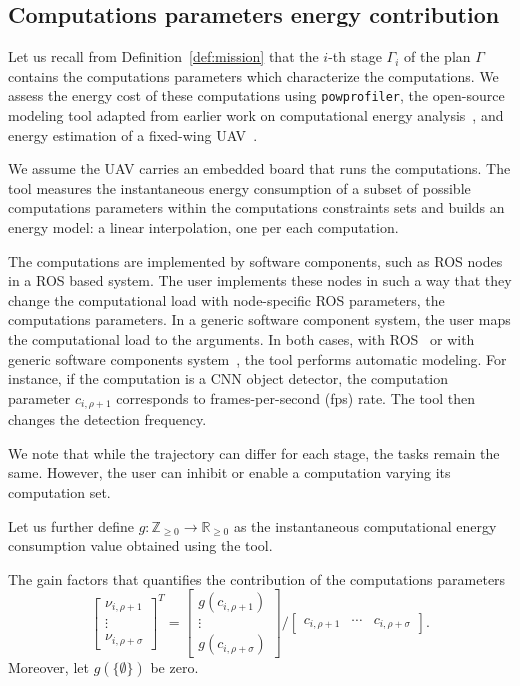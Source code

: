 \documentclass[letterpaper,10pt,conference]{ieeeconf}
\newcommand{\stt}[1]{{\small\tt #1}} %
\newcommand{\powprof}{\stt{powprofiler}}
\theoremstyle{definition}
\begin{document}
\subsection{Computations parameters energy contribution}
\label{sec:computations-model}

Let us recall from Definition~\ref{def:mission} that the $i$-th stage $\Gamma_i$ of the plan $\Gamma$ contains the computations parameters which characterize the computations. We assess the energy cost of these computations using \powprof{}, the open-source modeling tool adapted from earlier work on computational energy analysis~\cite{seewald2019coarse, seewald2019component}, and energy estimation of a fixed-wing UAV~\cite{seewald2020mechanical}. 

We assume the UAV carries an embedded board that runs the computations. The tool measures the instantaneous energy consumption of a subset of possible computations parameters within the computations constraints sets and builds an energy model: a linear interpolation, one per each computation. 

The computations are implemented by software components, such as ROS nodes in a ROS based system. The user implements these nodes in such a way that they change the computational load with node-specific ROS parameters, the computations parameters. In a generic software component system, the user maps the computational load to the arguments. In both cases, with ROS~\cite{zamanakos2020energy} or with generic software components system~\cite{seewald2019component}, the tool performs automatic modeling. For instance, if the computation is a CNN object detector, the computation parameter $c_{i,\rho+1}$ corresponds to frames-per-second (fps) rate. The tool then changes the detection frequency.

We note that while the trajectory can differ for each stage, the tasks remain the same. However, the user can inhibit or enable a computation varying its computation set.

Let us further define $g:\mathbb{Z}_{\geq 0}\rightarrow\mathbb{R}_{\geq 0}$ as the instantaneous computational energy consumption value obtained using the tool.

The gain factors that quantifies the contribution of the computations parameters
\begin{equation*}\label{eq:energy-comp}
  \begin{bmatrix}\nu_{i,\rho+1} \\ \vdots \\ \nu_{i,\rho+\sigma}\end{bmatrix}^T=\begin{bmatrix}g(c_{i,\rho+1}) \\ \vdots \\ g(c_{i,\rho+\sigma})\end{bmatrix}/\begin{bmatrix}c_{i,\rho+1} & \cdots & c_{i,\rho+\sigma}\end{bmatrix}.
\end{equation*}
Moreover, let $g(\{\emptyset\})$ be zero.
\end{document}
